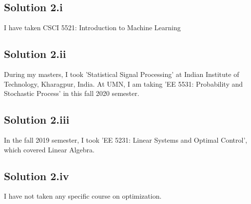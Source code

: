 \subsection*{Solution 2.i}
I have taken CSCI 5521: Introduction to Machine Learning
\subsection*{Solution 2.ii}
During my masters, I took 'Statistical Signal Processing' at Indian Institute of Technology, Kharagpur, India. At UMN, I am taking 'EE 5531: Probability and Stochastic Process' in this fall 2020 semester.
\subsection*{Solution 2.iii}
In the fall 2019 semester, I took 'EE 5231: Linear Systems and Optimal Control', which covered Linear Algebra.
\subsection*{Solution 2.iv}
I have not taken any specific course on optimization.